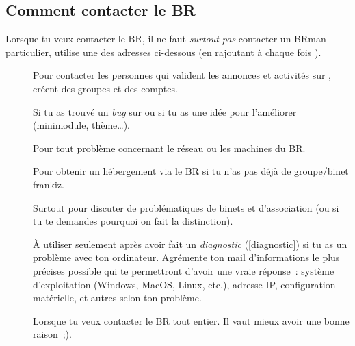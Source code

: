 \subsection{Comment contacter le BR}

Lorsque tu veux contacter le BR, il ne faut \emph{surtout pas} contacter un BRman particulier, utilise une des adresses ci-dessous (en rajoutant à chaque fois ).

\begin{description}

\item[] Pour contacter les personnes qui valident les annonces et activités sur \fkz, créent des groupes et des comptes.

\item[] Si tu as trouvé un \emph{bug} sur \fkz ou si tu as une idée pour l'améliorer (minimodule, thème\dots).

\item[] Pour tout problème concernant le réseau ou les machines du BR.

\item[] Pour obtenir un hébergement via le BR si tu n'as pas déjà de groupe/binet frankiz.



\item[] Surtout pour discuter de problématiques de binets et d'association (ou si tu te demandes pourquoi on fait la distinction).


\item[] À utiliser seulement après avoir fait un \emph{diagnostic} (\ref{diagnostic}) si tu as un problème avec ton ordinateur. Agrémente ton mail d'informations le plus précises possible qui te permettront d'avoir une vraie réponse~: système d'exploitation (Windows, MacOS, Linux, etc.), adresse IP, configuration matérielle, et autres selon ton problème.


\item[] Lorsque tu veux contacter le BR tout entier. Il vaut mieux avoir une bonne raison~;).

\end{description}

